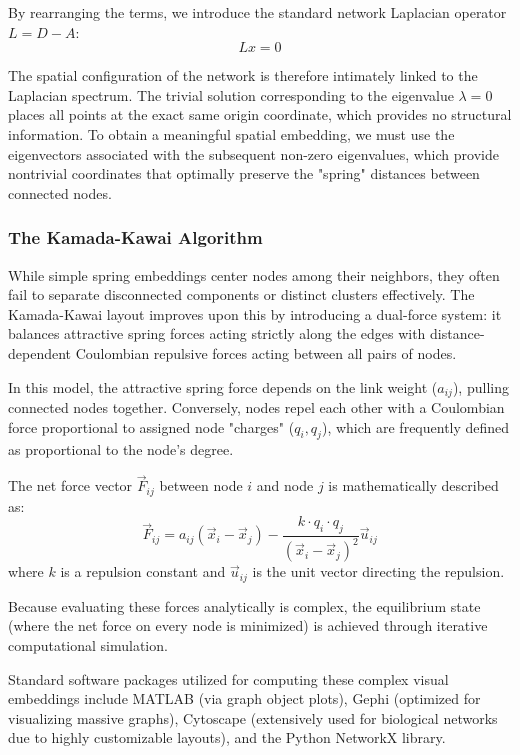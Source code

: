 By rearranging the terms, we introduce the standard network Laplacian operator $L = D - A$:
$$Lx = 0$$

The spatial configuration of the network is therefore intimately linked to the Laplacian spectrum. The trivial solution corresponding to the eigenvalue $\lambda = 0$ places all points at the exact same origin coordinate, which provides no structural information. To obtain a meaningful spatial embedding, we must use the eigenvectors associated with the subsequent non-zero eigenvalues, which provide nontrivial coordinates that optimally preserve the "spring" distances between connected nodes.

\subsubsection{The Kamada-Kawai Algorithm}
\label{subsubsec:kamada_kawai}

While simple spring embeddings center nodes among their neighbors, they often fail to separate disconnected components or distinct clusters effectively. The Kamada-Kawai layout improves upon this by introducing a dual-force system: it balances attractive spring forces acting strictly along the edges with distance-dependent Coulombian repulsive forces acting between all pairs of nodes.

In this model, the attractive spring force depends on the link weight ($a_{ij}$), pulling connected nodes together. Conversely, nodes repel each other with a Coulombian force proportional to assigned node "charges" ($q_i, q_j$), which are frequently defined as proportional to the node's degree.

The net force vector $\vec{F}_{ij}$ between node $i$ and node $j$ is mathematically described as:
$$\vec{F}_{ij} = a_{ij}(\vec{x}_i - \vec{x}_j) - \frac{k \cdot q_i \cdot q_j}{(\vec{x}_i - \vec{x}_j)^2} \vec{u}_{ij}$$
where $k$ is a repulsion constant and $\vec{u}_{ij}$ is the unit vector directing the repulsion.

Because evaluating these forces analytically is complex, the equilibrium state (where the net force on every node is minimized) is achieved through iterative computational simulation.

Standard software packages utilized for computing these complex visual embeddings include MATLAB (via graph object plots), Gephi (optimized for visualizing massive graphs), Cytoscape (extensively used for biological networks due to highly customizable layouts), and the Python NetworkX library.


